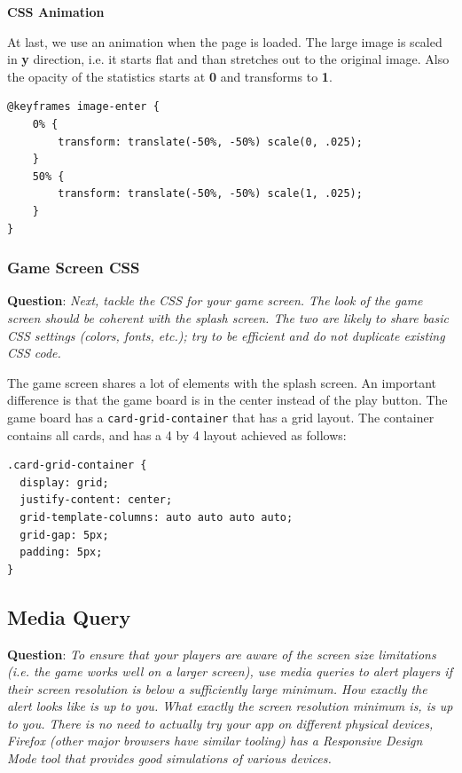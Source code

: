 \documentclass{article}
\begin{document}
\textbf{CSS Animation}

At last, we use an animation when the page is loaded. The large image is scaled in \textbf{y} direction, i.e. it starts flat and than stretches out to the original image. Also the opacity of the statistics starts at \textbf{0} and transforms to \textbf{1}.

\begin{lstlisting}
@keyframes image-enter {
	0% {
		transform: translate(-50%, -50%) scale(0, .025);
	}
	50% {
		transform: translate(-50%, -50%) scale(1, .025);
	}
}
\end{lstlisting}

\subsubsection{Game Screen CSS}



\textbf{Question}: \textit{Next, tackle the CSS for your game screen. The look of the game screen should be coherent with the splash screen. The two are likely to share basic CSS settings (colors, fonts, etc.); try to be efficient and do not duplicate existing CSS code.}

The game screen shares a lot of elements with the splash screen. An important difference is that the game board is in the center instead of the play button. The game board has a \texttt{card-grid-container} that has a grid layout. The container contains all cards, and has a 4 by 4 layout achieved as follows:

\begin{lstlisting}
.card-grid-container {
  display: grid;
  justify-content: center;
  grid-template-columns: auto auto auto auto;
  grid-gap: 5px;
  padding: 5px;
}
\end{lstlisting}

\subsection{Media Query}

\textbf{Question}: \textit{To ensure that your players are aware of the screen size limitations (i.e. the game works well on a larger screen), use media queries to alert players if their screen resolution is below a sufficiently large minimum. How exactly the alert looks like is up to you. What exactly the screen resolution minimum is, is up to you. There is no need to actually try your app on different physical devices, Firefox (other major browsers have similar tooling) has a Responsive Design Mode tool that provides good simulations of various devices.}
\end{document}
